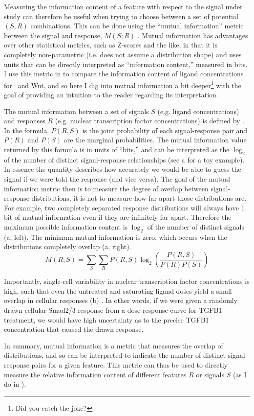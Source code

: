 Measuring the information content of a feature with
respect to the signal under study can therefore be useful
when trying to choose between a set of potential $(S,R)$
combinations. This can be
done using the ``mutual information'' metric
between the signal and response, $M(S;R)$  \cite{Cheong2011}.
Mutual information has advantages over other statistical metrics,
such as Z-scores and the like, in that it is completely
non-parametric (i.e. does not assume a distribution shape)
and uses units that
can be directly interpreted as ``information content,'' measured in bits.
I use this metric in  to compare
the information content of ligand concentrations for \tgfbsf\
and Wnt, and so here I dig into mutual information a bit
deeper\footnote{Did you catch the joke?}
with the goal of providing an intuition to the reader
regarding its interpretation.


The mutual information between a set of signals $S$
(e.g. ligand concentrations) and
responses $R$ (e.g. nuclear transcription factor concentrations) is defined
by \ar{eq:imaging:mi}. In the formula, $P(R,S)$ is the joint
probability of each signal-response pair
and $P(R)$ and $P(S)$ are the marginal
probabilities.
The mutual information value returned by this formula
is in units of ``bits,'' and can
be interpreted as the $\log_2$ of the number of
distinct signal-response relationships
(see a for a toy example).
In essence the quantity describes how accurately
we would be able to guess the signal if we were
told the response (and vice versa).
The goal of the mutual information metric then
is to measure the degree of overlap between
signal-response distributions, it is not to measure
how far apart those distributions are. For example,
two completely separated response distributions will
always have 1 bit of mutual information even if they
are infinitely far apart. Therefore the maximum possible
information content is $\log_2$ of the number of distinct
signals (a, left). The minimum mutual information is zero, which
occurs when the distributions completely overlap (\ar{fig:imaging:MI}a, right).
    \begin{equation} \label{eq:imaging:mi}
    M(R;S)=\sum_S\sum_R P(R,S)\log_2\left(\frac{P(R,S)}{P(R)P(S)}\right)
    \end{equation}



Importantly, single-cell
variability in nuclear transcription factor
concentrations is high, such that even the
untreated and saturating ligand
doses yield a small overlap in cellular
responses (b) \cite{Cheong2011}. In other words,
if we were given a randomly drawn cellular Smad2/3
response from a dose-response curve for TGFB1 treatment,
we would have high uncertainty as to the precise
TGFB1 concentration that caused the drawn response.


In summary, mutual information is a metric that
measures the overlap of distributions, and so can
be interpreted to indicate the number of distinct
signal-response pairs for a given feature. This
metric can thus be used to directly measure the
relative information content of different features $R$
or signals $S$ (as I do in ).